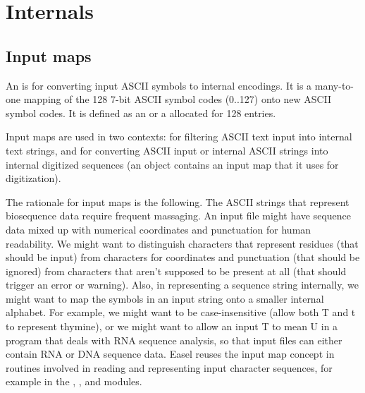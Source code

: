 \section{Internals}

\subsection{Input maps}

An  is for converting input ASCII symbols to
internal encodings. It is a many-to-one mapping of the 128 7-bit ASCII
symbol codes (0..127) onto new ASCII symbol codes. It is defined as
an  or a 
allocated for 128 entries.

Input maps are used in two contexts: for filtering ASCII text input
into internal text strings, and for converting ASCII input or internal
ASCII strings into internal digitized sequences (an 
object contains an input map that it uses for digitization).

The rationale for input maps is the following. The ASCII strings that
represent biosequence data require frequent massaging. An input file
might have sequence data mixed up with numerical coordinates and
punctuation for human readability. We might want to distinguish
characters that represent residues (that should be input) from
characters for coordinates and punctuation (that should be ignored)
from characters that aren't supposed to be present at all (that should
trigger an error or warning). Also, in representing a sequence string
internally, we might want to map the symbols in an input string onto a
smaller internal alphabet. For example, we might want to be
case-insensitive (allow both T and t to represent thymine), or we
might want to allow an input T to mean U in a program that deals with
RNA sequence analysis, so that input files can either contain RNA or
DNA sequence data.  Easel reuses the input map concept in routines
involved in reading and representing input character sequences, for
example in the , , and 
modules.


